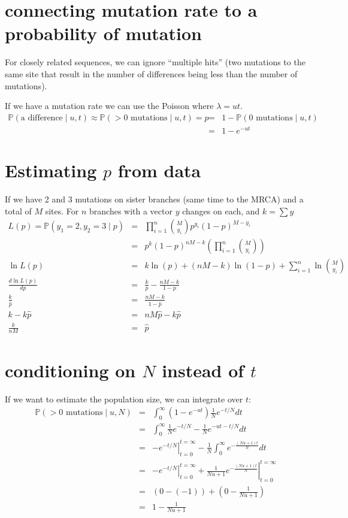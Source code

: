 \documentclass[11pt]{article}
\renewcommand{\Pr}{\mathbb{P}}
\begin{document}
\section*{connecting mutation rate to a probability of mutation}
For closely related sequences, we can ignore ``multiple hits'' (two mutations to the same
site that result in the number of differences being less than the number of mutations).

If we have a mutation rate we can use the Poisson where $\lambda = ut$.
\begin{eqnarray*}
    \Pr(\mbox{a difference} \mid u, t) \approx \Pr(>0 \mbox{ mutations} \mid u, t) = p
    & = & 1 - \Pr(0 \mbox{ mutations} \mid u, t) \\
    & = & 1 - e^{- ut}
\end{eqnarray*}



\section*{Estimating $p$ from data}
If we have 2 and 3 mutations on sister branches (same time to the MRCA) and a total of 
$M$ sites.
For $n$ branches with a vector $y$ changes on each, and $k= \sum y$
\begin{eqnarray*}
   L(p) =  \Pr(y_1=2, y_2=3 \mid p)
   & = & \prod_{i=1}^n {M \choose y_i} p^{y_i}(1-p)^{M-y_i} \\ 
   & = & p^{k}(1-p)^{nM-k} \left(\prod_{i=1}^n {M \choose y_i} \right)  \\ 
   \ln L(p) & = & k\ln(p) + (nM - k)\ln(1-p) + \sum_{i=1}^n \ln {M \choose y_i} \\
   \frac{d\ln L(p)}{dp} & = & \frac{k}{p} - \frac{nM - k}{1-p}\\
   \frac{k}{\hat{p}} & = & \frac{nM - k}{1-\hat{p}} \\
   k - k\hat{p} & = & nM\hat{p} - k\hat{p} \\
   \frac{k}{nM} & = & \hat{p}
\end{eqnarray*}


\section*{conditioning on $N$ instead of $t$}
If we want to estimate the population size, we can integrate over $t$:
\begin{eqnarray*}
\Pr(>0 \mbox{ mutations} \mid u, N) & = & \int_0^\infty\left(1 - e^{- ut}\right)\frac{1}{N}e^{-t/N} dt\\
& = & \int_0^\infty\frac{1}{N}e^{-t/N} - \frac{1}{N}e^{- ut-t/N} dt \\
& = & \left.-e^{-t/N}\right|_{t=0}^{t=\infty} - \frac{1}{N}\int_0^\infty e^{-\frac{(Nu + 1)t}{N}} dt \\
& = & \left.-e^{-t/N}\right|_{t=0}^{t=\infty} + \left.\frac{1}{Nu + 1} e^{-\frac{(Nu + 1)t}{N}}\right|_{t=0}^{t=\infty} \\
& = & \left(0 - (-1)\right) + \left(0 - \frac{1}{Nu + 1}\right) \\
& = & 1 - \frac{1}{Nu + 1}
\end{eqnarray*}
\end{document}

